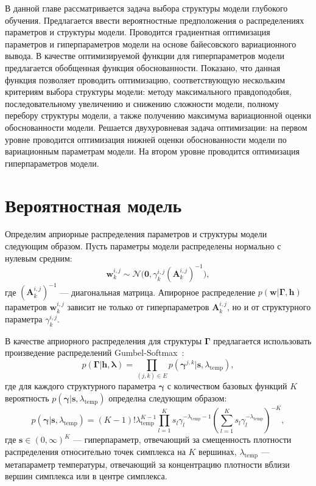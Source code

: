 В данной главе рассматривается задача выбора структуры модели глубокого обучения. Предлагается ввести вероятностные предположения о распределениях параметров и структуры модели. 
Проводится градиентная оптимизация параметров и гиперпараметров модели на основе байесовского вариационного вывода.  В качестве оптимизируемой функции для гиперпараметров модели предлагается обобщенная функция обоснованности. Показано, что данная функция позволяет проводить оптимизацию, соответствующую нескольким критериям выбора структуры модели: методу максимального правдоподобия, последовательному увеличению и снижению сложности модели, полному перебору структуры модели, а также получению максимума вариационной оценки обоснованности модели. Решается двухуровневая задача оптимизации: на первом уровне проводится оптимизация нижней оценки обоснованности модели по вариационным параметрам модели. На втором уровне проводится оптимизация гиперпараметров модели.

\section{Вероятностная модель}
Определим априорные распределения параметров и структуры модели следующим образом.
Пусть параметры модели распределены нормально с нулевым средним:
\[
    \mathbf{w}^{i,j}_k \sim \mathcal{N}\bigl(\mathbf{0}, \gamma^{i,j}_k(\mathbf{A}^{i,j}_k)^{-1}\bigr),
\]
где $ (\mathbf{A}^{i,j}_k)^{-1}$ --- диагональная матрица. Апирорное распределение $p(\mathbf{w}|\boldsymbol{\Gamma}, \mathbf{h})$ параметров $\mathbf{w}^{i,j}_k$ зависит не только от гиперпараметров $\mathbf{A}_k^{i,j}$, но и от структурного параметра $\gamma^{i,j}_k$.


В качестве априорного распределения для структуры $\boldsymbol{\Gamma}$ предлагается использовать произведение распределений Gumbel-Softmax~\cite{gs}:
\[
    p(\boldsymbol{\Gamma}|\mathbf{h},\boldsymbol{\lambda}) = \prod_{(j,k) \in E} p(\boldsymbol{\gamma}^{j,k}|\mathbf{s}, \lambda_\text{temp}),
\]
где для каждого структурного параметра $\boldsymbol{\gamma}$ с количеством базовых функций $K$ вероятность $p(\boldsymbol{\gamma}|\mathbf{s}, \lambda_\text{temp})$ определна следующим образом:
\[
    p(\boldsymbol{\gamma}|\mathbf{s}, \lambda_\text{temp}) = (K-1)!\lambda_{\text{temp}}^{K-1}\prod_{l=1}^K s_l\gamma_l^{-\lambda_\text{temp} -1} \left(\sum_{l=1}^K s_l\gamma_l^{-\lambda_\text{temp}}\right)^{-K},
\]
где $\mathbf{s} \in (0,\infty)^K$ --- гиперпараметр, отвечающий за смещенность плотности распределения относительно точек симплекса на $K$ вершинах, $\lambda_{\text{temp}}$ --- метапараметр температуры, отвечающий за концентрацию плотности вблизи вершин симплекса или в центре симплекса.

